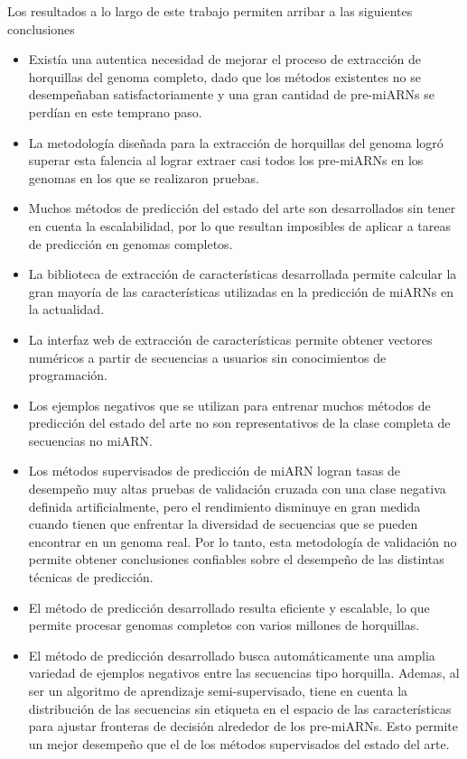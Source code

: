 Los resultados a lo largo de este trabajo permiten arribar a las siguientes conclusiones
\begin{itemize}
\item Existía una autentica necesidad de mejorar el proceso de extracción de horquillas del genoma completo, dado que los métodos existentes no se desempeñaban
	satisfactoriamente y una gran cantidad de pre-miARNs se perdían en este temprano paso.
\item La metodología diseñada para la extracción de horquillas del genoma logró superar esta falencia al lograr extraer casi todos los pre-miARNs en los genomas
	en los que se realizaron pruebas.
\item Muchos métodos de predicción del estado del arte son desarrollados sin tener en cuenta la escalabilidad, por lo que resultan imposibles de aplicar a tareas
	de predicción en genomas completos.
\item La biblioteca de extracción de características desarrollada permite calcular la gran mayoría de las características utilizadas en la predicción de miARNs en la
	actualidad.
\item La interfaz web de extracción de características permite obtener vectores numéricos a partir de secuencias a usuarios sin conocimientos de programación.
\item Los ejemplos negativos que se utilizan para entrenar muchos métodos de predicción del estado del arte no son representativos de la clase completa de secuencias
	no miARN.
\item Los métodos supervisados de predicción de miARN logran tasas de desempeño muy altas pruebas de validación cruzada con una clase negativa definida artificialmente,
	pero el rendimiento disminuye en gran medida cuando tienen que enfrentar la diversidad de secuencias que se pueden encontrar en un genoma real. Por lo tanto,
	esta metodología de validación no permite obtener conclusiones confiables sobre el desempeño de las distintas técnicas de predicción.
\item El método de predicción desarrollado resulta eficiente y escalable, lo que permite procesar genomas completos con varios millones de horquillas.
\item El método de predicción desarrollado busca automáticamente una amplia variedad de ejemplos negativos entre las secuencias tipo horquilla. Ademas, al ser un algoritmo
	de aprendizaje semi-supervisado, tiene en cuenta la distribución de las secuencias sin etiqueta en el espacio de las características para ajustar fronteras de
	decisión alrededor de los pre-miARNs. Esto permite un mejor desempeño que el de los métodos supervisados del estado del arte.
\end{itemize}

